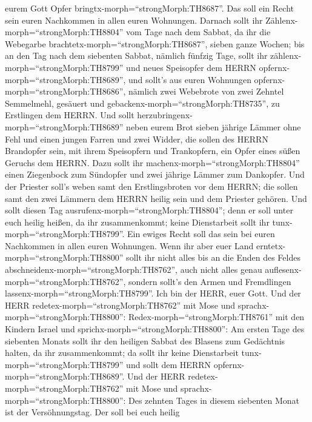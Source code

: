 eurem Gott Opfer bringtx-morph=``strongMorph:TH8687''. Das soll ein
Recht sein euren Nachkommen in allen euren Wohnungen. 
Darnach sollt ihr Zählenx-morph=``strongMorph:TH8804'' vom Tage nach dem
Sabbat, da ihr die Webegarbe brachtetx-morph=``strongMorph:TH8687'',
sieben ganze Wochen;  bis an den Tag nach dem siebenten
Sabbat, nämlich fünfzig Tage, sollt ihr
zählenx-morph=``strongMorph:TH8799'' und neues Speisopfer dem HERRN
opfernx-morph=``strongMorph:TH8689'',  und sollt's aus
euren Wohnungen opfernx-morph=``strongMorph:TH8686'', nämlich zwei
Webebrote von zwei Zehntel Semmelmehl, gesäuert und
gebackenx-morph=``strongMorph:TH8735'', zu Erstlingen dem HERRN.
 Und sollt herzubringenx-morph=``strongMorph:TH8689'' neben
eurem Brot sieben jährige Lämmer ohne Fehl und einen jungen Farren und
zwei Widder, die sollen des HERRN Brandopfer sein, mit ihrem Speisopfern
und Trankopfern, ein Opfer eines süßen Geruchs dem HERRN. 
Dazu sollt ihr machenx-morph=``strongMorph:TH8804'' einen Ziegenbock zum
Sündopfer und zwei jährige Lämmer zum Dankopfer.  Und der
Priester soll's weben samt den Erstlingsbroten vor dem HERRN; die sollen
samt den zwei Lämmern dem HERRN heilig sein und dem Priester gehören.
 Und sollt diesen Tag
ausrufenx-morph=``strongMorph:TH8804''; denn er soll unter euch heilig
heißen, da ihr zusammenkommt; keine Dienstarbeit sollt ihr
tunx-morph=``strongMorph:TH8799''. Ein ewiges Recht soll das sein bei
euren Nachkommen in allen euren Wohnungen.  Wenn ihr aber
euer Land erntetx-morph=``strongMorph:TH8800'' sollt ihr nicht alles bis
an die Enden des Feldes abschneidenx-morph=``strongMorph:TH8762'', auch
nicht alles genau auflesenx-morph=``strongMorph:TH8762'', sondern
sollt's den Armen und Fremdlingen lassenx-morph=``strongMorph:TH8799''.
Ich bin der HERR, euer Gott.  Und der HERR
redetex-morph=``strongMorph:TH8762'' mit Mose und
sprachx-morph=``strongMorph:TH8800'': 
Redex-morph=``strongMorph:TH8761'' mit den Kindern Israel und
sprichx-morph=``strongMorph:TH8800'': Am ersten Tage des siebenten
Monats sollt ihr den heiligen Sabbat des Blasens zum Gedächtnis halten,
da ihr zusammenkommt;  da sollt ihr keine Dienstarbeit
tunx-morph=``strongMorph:TH8799'' und sollt dem HERRN
opfernx-morph=``strongMorph:TH8689''.  Und der HERR
redetex-morph=``strongMorph:TH8762'' mit Mose und
sprachx-morph=``strongMorph:TH8800'':  Des zehnten Tages in
diesem siebenten Monat ist der Versöhnungstag. Der soll bei euch heilig
